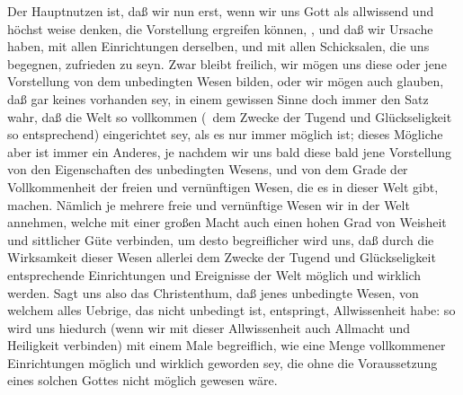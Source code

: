\begin{aufza}
\item Der Hauptnutzen ist, daß wir nun erst, wenn wir uns Gott als allwissend und höchst weise denken, die Vorstellung ergreifen können, , und daß wir Ursache haben, mit allen Einrichtungen derselben, und mit allen Schicksalen, die uns begegnen, zufrieden zu seyn. Zwar bleibt freilich, wir mögen uns diese oder jene Vorstellung von dem unbedingten Wesen bilden, oder wir mögen auch glauben, daß gar keines vorhanden sey, in einem gewissen Sinne doch immer den Satz wahr, daß die Welt so vollkommen (\dh\ dem Zwecke der Tugend und Glückseligkeit so entsprechend) eingerichtet sey, als es nur immer möglich ist; dieses Mögliche aber ist immer ein Anderes, je nachdem wir uns bald diese bald jene Vorstellung von den Eigenschaften des unbedingten Wesens, und von dem Grade der Vollkommenheit der freien und vernünftigen Wesen, die es in dieser Welt gibt, machen. Nämlich je mehrere freie und vernünftige Wesen wir in der Welt annehmen, welche mit einer großen Macht auch einen hohen Grad von Weisheit und sittlicher Güte verbinden, um desto begreiflicher wird uns, daß durch die Wirksamkeit dieser Wesen allerlei dem Zwecke der Tugend und Glückseligkeit entsprechende Einrichtungen und Ereignisse der Welt möglich und wirklich werden. Sagt uns also das Christenthum, daß jenes unbedingte Wesen, von welchem alles Uebrige, das nicht unbedingt ist, entspringt, Allwissenheit habe: so wird uns hiedurch (wenn wir mit dieser Allwissenheit auch Allmacht und Heiligkeit verbinden) mit einem Male begreiflich, wie eine Menge vollkommener Einrichtungen möglich und wirklich geworden sey, die ohne die Voraussetzung eines solchen Gottes nicht möglich gewesen wäre.

\end{aufza}
